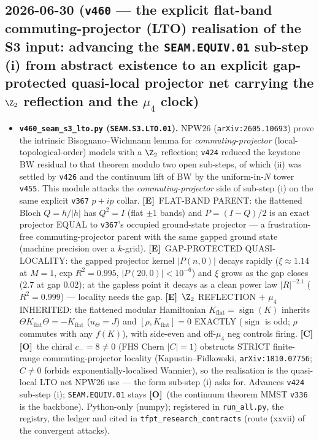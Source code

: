 \documentclass[11pt]{article}
\providecommand{\mE}{\textbf{[E]}}\providecommand{\mC}{\textbf{[C]}}
\providecommand{\mO}{\textbf{[O]}}\providecommand{\mX}{\textbf{[X]}}
\begin{document}
\subsection*{2026-06-30 (\texttt{v460} --- the explicit flat-band commuting-projector (LTO) realisation of the S3 input: advancing the \texttt{SEAM.EQUIV.01} sub-step (i) from abstract existence to an explicit gap-protected quasi-local projector net carrying the $\Z_2$ reflection and the $\mu_4$ clock)}
\begin{itemize}
\item \textbf{\texttt{v460\_seam\_s3\_lto.py} (\texttt{SEAM.S3.LTO.01}).} NPW26 (\texttt{arXiv:2605.10693}) prove the
intrinsic Bisognano--Wichmann lemma for \emph{commuting-projector} (local-topological-order) models with a $\Z_2$
reflection; \texttt{v424} reduced the keystone BW residual to that theorem modulo two open sub-steps, of which (ii)
was settled by \texttt{v426} and the continuum lift of BW by the uniform-in-$N$ tower \texttt{v455}. This module
attacks the \emph{commuting-projector} side of sub-step (i) on the same explicit \texttt{v367} $p{+}ip$ collar.
\mE\ FLAT-BAND PARENT: the flattened Bloch $Q{=}h/|h|$ has $Q^2{=}I$ (flat $\pm1$ bands) and $P{=}(I{-}Q)/2$ is an
exact projector EQUAL to \texttt{v367}'s occupied ground-state projector --- a frustration-free commuting-projector
parent with the same gapped ground state (machine precision over a $k$-grid). \mE\ GAP-PROTECTED QUASI-LOCALITY:
the gapped projector kernel $|P(n,0)|$ decays rapidly ($\xi{\approx}1.14$ at $M{=}1$, exp $R^2{=}0.995$,
$|P(20,0)|{<}10^{-6}$) and $\xi$ grows as the gap closes ($2.7$ at gap $0.02$); at the gapless point it decays as a
clean power law $|R|^{-2.1}$ ($R^2{=}0.999$) --- locality needs the gap. \mE\ $\Z_2$ REFLECTION $+$ $\mu_4$
INHERITED: the flattened modular Hamiltonian $K_{\mathrm{flat}}{=}\operatorname{sign}(K)$ inherits
$\Theta K_{\mathrm{flat}}\Theta{=}{-}K_{\mathrm{flat}}$ ($u_\Theta{=}J$) and $[\rho,K_{\mathrm{flat}}]{=}0$ EXACTLY
($\operatorname{sign}$ is odd; $\rho$ commutes with any $f(K)$), with side-even and off-$\mu_4$ neg controls firing.
\mC\mO\ the chiral $c_-{=}8{\neq}0$ (FHS Chern $|C|{=}1$) obstructs STRICT finite-range commuting-projector locality
(Kapustin--Fidkowski, \texttt{arXiv:1810.07756}; $C{\neq}0$ forbids exponentially-localised Wannier), so the
realisation is the quasi-local LTO net NPW26 use --- the form sub-step (i) asks for. Advances \texttt{v424} sub-step
(i); \texttt{SEAM.EQUIV.01} stays \mO\ (the continuum theorem MMST \texttt{v336} is the backbone). Python-only
(numpy); registered in \texttt{run\_all.py}, the registry, the ledger and cited in
\texttt{tfpt\_research\_contracts} (route (xxvii) of the convergent attacks).
\end{itemize}
\end{document}
